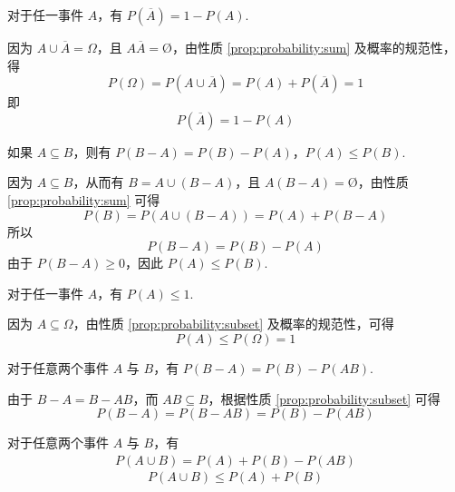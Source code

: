 \begin{property} \label{prop:probability:converse}
    对于任一事件 $A$，有 $P(\overline{A})=1-P(A)$.
\end{property}

\begin{myproof}
    因为 $A \cup \overline{A} = \varOmega$，且 $A \overline{A} = \text{\O}$，由性质 \ref*{prop:probability:sum} 及概率的规范性，得
    $$
    P(\varOmega) = P(A \cup \overline{A}) = P(A) + P(\overline{A}) = 1
    $$
    即
    \[
    P(\overline{A})=1-P(A)
    \]
\end{myproof}

\begin{property} \label{prop:probability:subset}
    如果 $A \subseteq B$，则有 $P(B-A)=P(B)-P(A)$，$P(A) \leqslant P(B)$.
\end{property}

\begin{myproof}
    因为 $A \subseteq B$，从而有 $B = A \cup (B-A)$，且 $A(B-A)=\text{\O}$，由性质 \ref*{prop:probability:sum} 可得
    $$
    P(B) = P(A \cup (B-A)) = P(A) + P(B-A)
    $$
    所以
    $$
    P(B-A)=P(B)-P(A)
    $$
    由于 $P(B-A) \geqslant 0$，因此 $P(A) \leqslant P(B)$.
\end{myproof}

\begin{property} \label{prop:probability:<=1}
    对于任一事件 $A$，有 $P(A) \leqslant 1$.
\end{property}

\begin{myproof}
    因为 $A \subseteq \varOmega$，由性质 \ref*{prop:probability:subset} 及概率的规范性，可得
    \[
    P(A) \leqslant P(\varOmega) = 1
    \]
\end{myproof}

\begin{property}[(概率的减法公式)] \label{prop:probability:subtraction}
    对于任意两个事件 $A$ 与 $B$，有 $P(B-A)=P(B)-P(AB)$.
\end{property}

\begin{myproof}
    由于 $B-A=B-AB$，而 $AB \subseteq B$，根据性质 \ref*{prop:probability:subset} 可得
    \[
    P(B-A)=P(B-AB)=P(B)-P(AB)
    \]
\end{myproof}

\begin{property}
    对于任意两个事件 $A$ 与 $B$，有
    \begin{gather} \label{equation:add}
        P(A \cup B) = P(A) + P(B) - P(AB)
    \end{gather}
    $$
    P(A \cup B) \leqslant P(A) + P(B)
    $$
\end{property}

